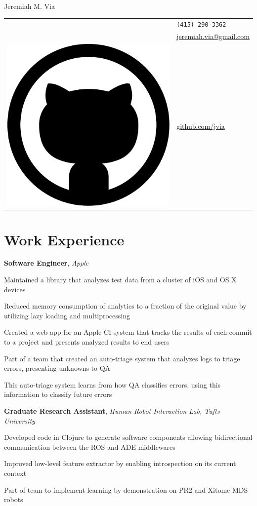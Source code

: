 \documentclass[10pt, letter]{article}
\newcommand*\github{\includegraphics[height=2ex]{github.pdf}}
\newcommand{\years}[1]{\marginnote{\scriptsize #1}}
\newenvironment{itemize*}{
  \begin{itemize}
    \setlength{\itemsep}{0pt}
    \setlength{\parskip}{-1pt}
    \setlength{\parsep}{-1pt}
  }{
  \end{itemize}
}
\begin{document}
\begin{minipage}[t]{0.55\textwidth}
  {\LARGE Jeremiah M. Via}
\end{minipage}
\begin{minipage}[t]{0.4\textwidth}
  \begin{tabular}[h]{ll}
    \Phone{}    & \texttt{(415) 290-3362}\\
    \Envelope{} & \href{mailto:jeremiah.via@gmail.com}{jeremiah.via@gmail.com}\\    
    \github{}   & \href{http://www.github.com/jvia}{github.com/jvia}
  \end{tabular}
\end{minipage}

\section*{Work Experience}
\years{2014--2015}
\textbf{Software Engineer}, \textsl{Apple}
\begin{itemize*}
\item Maintained a library that analyzes test data from a cluster of
  iOS and OS X devices
\item Reduced memory consumption of analytics to a fraction of the
  original value by utilizing lazy loading and multiprocessing
\item Created a web app for an Apple CI system that tracks the results of
  each commit to a project and presents analyzed results to end users
\item Part of a team that created an auto-triage system that analyzes
  logs to triage errors, presenting unknowns to QA
\item This auto-triage system learns from how QA classifies errors,
  using this information to classify future errors
\end{itemize*}

\years{2012--2014}
\textbf{Graduate Research Assistant}, \textsl{Human Robot Interaction Lab, Tufts University}
\begin{itemize*}
\item Developed code in Clojure to generate software components
  allowing bidirectional communication between the ROS and ADE
  middlewares
\item Improved low-level feature extractor by enabling introspection
  on its current context
\item Part of team to implement learning by demonstration on PR2 and
  Xitome MDS robots
\end{itemize*}
\end{document}
